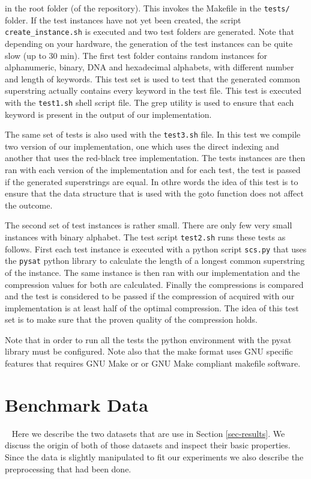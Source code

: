\documentclass[english,twoside,censored,csm,algorithms-track-2020]{HYthesisML}
\theoremstyle{plain}
\theoremstyle{definition}
\begin{document}
in the root folder (of the repository). This invokes the Makefile in the \texttt{tests/} folder. If the
test instances have not yet been created, the script \texttt{create\_instance.sh} is executed and two
test folders are generated. Note that depending on your hardware, the generation of the test instances
can be quite slow (up to 30 min).
The first test folder contains random instances for alphanumeric, binary,
DNA and hexadecimal alphabets, with different number and length of keywords. This test set is used
to test that the generated common superstring actually contains every keyword in the test file. This
test is executed with the \texttt{test1.sh} shell script file. The grep utility is used to ensure
that each keyword is present in the output of our implementation. 

The same set of tests is also used with the \texttt{test3.sh} file. In this test we compile two version
of our implementation, one which uses the direct indexing and another that uses the red-black tree
implementation. The tests instances are then ran with each version of the implementation and for each
test, the test is passed if the generated superstrings are equal. In othre words the idea of this
test is to ensure that the data structure that is used with the goto function does not affect
the outcome.

The second set of test instances is rather small. There are only few very small instances with binary
alphabet. The test script \texttt{test2.sh} runs these tests as follows. First each test instance is
executed with a python script \texttt{scs.py} that uses the \texttt{pysat} python library to calculate
the length of a longest common superstring of the instance. The same instance is then ran with our
implementation and the compression values for both are calculated. Finally the compressions is compared
and the test is considered to be passed if the compression of acquired with our implementation is
at least half of the optimal compression. The idea of this test set is to make sure that the proven
quality of the compression holds.

Note that in order to run all the tests the python environment with the pysat library must be configured.
Note also that the make format uses GNU specific features that requires GNU Make or or GNU Make compliant
makefile software. 



\section{Benchmark Data}~\label{data}
Here we describe the two datasets that are use in Section \ref{sec-results}. We discuss the origin
of both of those datasets and inspect their basic properties. Since the data is slightly manipulated
to fit our experiments we also describe the preprocessing that had been done.
\end{document}
